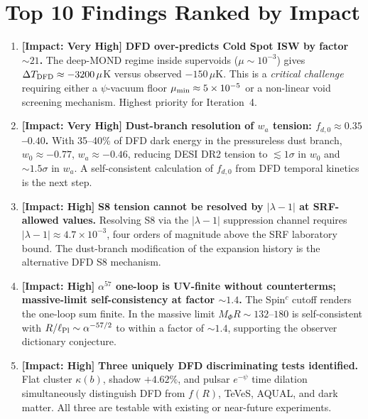 \documentclass[11pt]{article}
\newcommand{\ee}[1]{\times 10^{#1}}
\newcommand{\alphafine}{\alpha}
\newcommand{\lambdaone}{|\lambda-1|}
\newcommand{\mufd}{\mu}
\newcommand{\DFD}{{\rm DFD}}
\begin{document}
\section{Top 10 Findings Ranked by Impact}
\label{sec:top10}

\begin{enumerate}

\item \textbf{[Impact: Very High]} \textbf{DFD over-predicts Cold Spot ISW
by factor $\sim 21$.}  The deep-MOND regime inside supervoids
($\mufd \sim 10^{-3}$) gives $\Delta T_\DFD \approx -3200\,\mu$K
versus observed $-150\,\mu$K.  This is a \emph{critical challenge}
requiring either a $\psi$-vacuum floor $\mufd_{\rm min} \approx 5\ee{-5}$
or a non-linear void screening mechanism.  Highest priority for
Iteration~4.

\item \textbf{[Impact: Very High]} \textbf{Dust-branch resolution of $w_a$
tension: $f_{d,0} \approx 0.35$--$0.40$.}  With 35--40\% of DFD dark energy
in the pressureless dust branch, $w_0 \approx -0.77$, $w_a \approx -0.46$,
reducing DESI DR2 tension to $\lesssim 1\sigma$ in $w_0$ and $\sim 1.5\sigma$
in $w_a$.  A self-consistent calculation of $f_{d,0}$ from DFD temporal
kinetics is the next step.

\item \textbf{[Impact: High]} \textbf{S8 tension cannot be resolved by
$\lambdaone$ at SRF-allowed values.}  Resolving S8 via the $\lambdaone$
suppression channel requires $\lambdaone \approx 4.7\ee{-3}$, four orders
of magnitude above the SRF laboratory bound.  The dust-branch modification
of the expansion history is the alternative DFD S8 mechanism.

\item \textbf{[Impact: High]} \textbf{$\alpha^{57}$ one-loop is UV-finite
without counterterms; massive-limit self-consistency at factor $\sim 1.4$.}
The Spin$^c$ cutoff renders the one-loop sum finite.  In the massive limit
$M_\Phi R \sim 132$--$180$ is self-consistent with $R/\ell_{\rm Pl}
\sim \alphafine^{-57/2}$ to within a factor of $\sim 1.4$, supporting the
observer dictionary conjecture.

\item \textbf{[Impact: High]} \textbf{Three uniquely DFD discriminating tests
identified.}  Flat cluster $\kappa(b)$, shadow $+4.62\%$, and pulsar
$e^{-\psi}$ time dilation simultaneously distinguish DFD from $f(R)$,
TeVeS, AQUAL, and dark matter.  All three are testable with existing or
near-future experiments.


\end{enumerate}
\end{document}
